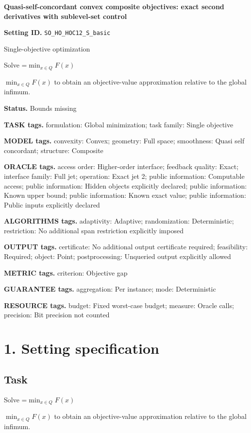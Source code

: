 \documentclass[10pt,a4paper]{article}
\newcommand{\AtlasMath}[1]{\par\begingroup\centering\setbox0=\hbox{$\displaystyle #1$}\ifdim\wd0>1.4\linewidth\typeout{ATLAS WIDE FORMULA: \the\wd0}\fi\ifdim\wd0>\linewidth\resizebox{\linewidth}{!}{\box0}\else\box0\fi\par\endgroup}
\newcommand{\AtlasInlineMath}[1]{\begingroup\setbox0=\hbox{$#1$}\ifdim\wd0>.4\linewidth\endgroup\AtlasMath{#1}\else\endgroup$#1$\fi}
\begin{document}
\raggedright

{\LARGE\bfseries\sffamily\color{AtlasNavy} Quasi-self-concordant convex composite objectives: exact second derivatives with sublevel-set control\par}\vspace{5pt}
\textbf{Setting ID.} \texttt{SO\_\allowbreak{}HO\_\allowbreak{}HOC12\_\allowbreak{}S\_\allowbreak{}basic}

Single-objective optimization

Solve \AtlasInlineMath{\min_{x\in Q}F(x)} to obtain an objective-value approximation relative to the global infimum.

\textbf{Status.} Bounds missing

\textbf{TASK tags.} formulation: Global minimization; task family: Single objective

\textbf{MODEL tags.} convexity: Convex; geometry: Full space; smoothness: Quasi self concordant; structure: Composite

\textbf{ORACLE tags.} access order: Higher-order interface; feedback quality: Exact; interface family: Full jet; operation: Exact jet 2; public information: Computable access; public information: Hidden objects explicitly declared; public information: Known upper bound; public information: Known exact value; public information: Public inputs explicitly declared

\textbf{ALGORITHMS tags.} adaptivity: Adaptive; randomization: Deterministic; restriction: No additional span restriction explicitly imposed

\textbf{OUTPUT tags.} certificate: No additional output certificate required; feasibility: Required; object: Point; postprocessing: Unqueried output explicitly allowed

\textbf{METRIC tags.} criterion: Objective gap

\textbf{GUARANTEE tags.} aggregation: Per instance; mode: Deterministic

\textbf{RESOURCE tags.} budget: Fixed worst-case budget; measure: Oracle calls; precision: Bit precision not counted

\section{1. Setting specification}
\subsection{Task}
Solve \AtlasInlineMath{\min_{x\in Q}F(x)} to obtain an objective-value approximation relative to the global infimum.
\end{document}
